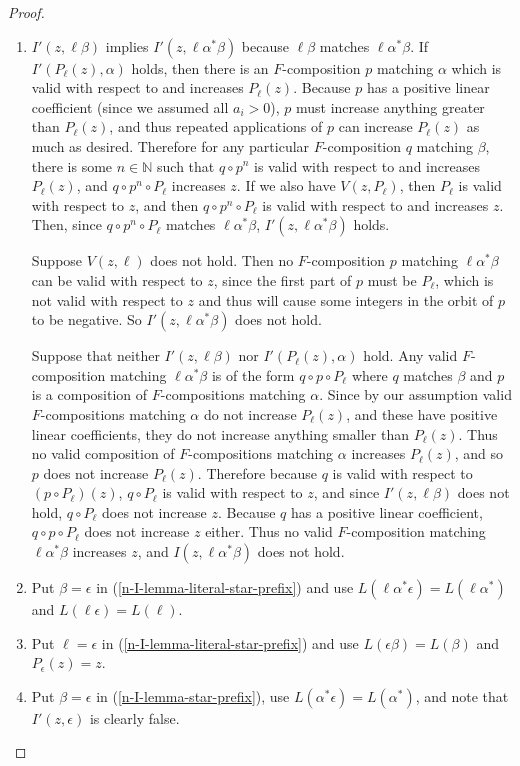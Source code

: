 \documentclass[11pt]{amsart}
\newcommand{\N}{\mathbb{N}}
\theoremstyle{definition}
\theoremstyle{remark}
\begin{document}
\begin{proof}
\begin{enumerate}
\item $I'(z, \ell \beta)$ implies $I'(z, \ell \alpha^* \beta)$ because $\ell \beta$ matches $\ell \alpha^* \beta$. If $I'(P_\ell(z), \alpha)$ holds, then there is an $F$-composition $p$ matching $\alpha$ which is valid with respect to and increases $P_\ell(z)$. Because $p$ has a positive linear coefficient (since we assumed all $a_i > 0$), $p$ must increase anything greater than $P_\ell(z)$, and thus repeated applications of $p$ can increase $P_\ell(z)$ as much as desired. Therefore for any particular $F$-composition $q$ matching $\beta$, there is some $n \in \N$ such that $q \circ p^n$ is valid with respect to and increases $P_\ell(z)$, and $q \circ p^n \circ P_\ell$ increases $z$. If we also have $V(z, P_\ell)$, then $P_\ell$ is valid with respect to $z$, and then $q \circ p^n \circ P_\ell$ is valid with respect to and increases $z$. Then, since $q \circ p^n \circ P_\ell$ matches $\ell \alpha^* \beta$, $I'(z, \ell \alpha^* \beta)$ holds.

Suppose $V(z, \ell)$ does not hold. Then no $F$-composition $p$ matching $\ell \alpha^* \beta$ can be valid with respect to $z$, since the first part of $p$ must be $P_\ell$, which is not valid with respect to $z$ and thus will cause some integers in the orbit of $p$ to be negative. So $I'(z, \ell \alpha^* \beta)$ does not hold.

Suppose that neither $I'(z, \ell \beta)$ nor $I'(P_\ell(z), \alpha)$ hold. Any valid $F$-composition matching $\ell \alpha^* \beta$ is of the form $q \circ p \circ P_\ell$ where $q$ matches $\beta$ and $p$ is a composition of $F$-compositions matching $\alpha$. Since by our assumption valid $F$-compositions matching $\alpha$ do not increase $P_\ell(z)$, and these have positive linear coefficients, they do not increase anything smaller than $P_\ell(z)$. Thus no valid composition of $F$-compositions matching $\alpha$ increases $P_\ell(z)$, and so $p$ does not increase $P_\ell(z)$. Therefore because $q$ is valid with respect to $(p \circ P_\ell)(z)$, $q \circ P_\ell$ is valid with respect to $z$, and since $I'(z, \ell \beta)$ does not hold, $q \circ P_\ell$ does not increase $z$. Because $q$ has a positive linear coefficient, $q \circ p \circ P_\ell$ does not increase $z$ either. Thus no valid $F$-composition matching $\ell \alpha^* \beta$ increases $z$, and $I(z, \ell \alpha^* \beta)$ does not hold.
\item Put $\beta = \epsilon$ in (\ref{n-I-lemma-literal-star-prefix}) and use $L(\ell \alpha^* \epsilon) = L(\ell \alpha^*)$ and $L(\ell \epsilon) = L(\ell)$.
\item Put $\ell = \epsilon$ in (\ref{n-I-lemma-literal-star-prefix}) and use $L(\epsilon \beta) = L(\beta)$ and $P_\epsilon(z) = z$.
\item Put $\beta = \epsilon$ in (\ref{n-I-lemma-star-prefix}), use $L(\alpha^* \epsilon) = L(\alpha^*)$, and note that $I'(z, \epsilon)$ is clearly false. \qedhere
\end{enumerate}
\end{proof}
\end{document}
